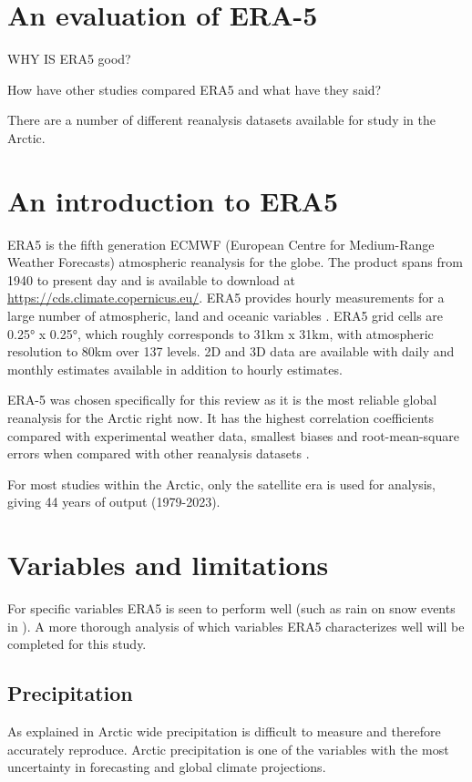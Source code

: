 \documentclass[11pt, oneside]{article}
\begin{document}
\section{An evaluation of ERA-5}
WHY IS ERA5 good?

How have other studies compared ERA5 and what have they said?

There are a number of different reanalysis datasets available for study in the Arctic. 


\section{An introduction to ERA5}
ERA5 is the fifth generation ECMWF (European Centre for Medium-Range Weather Forecasts) atmospheric reanalysis for the globe. The product spans from 1940 to present day and is available to download at \url{https://cds.climate.copernicus.eu/}. ERA5 provides hourly measurements for a large number of atmospheric, land and oceanic variables \cite{hersbach2020era5}. 
ERA5 grid cells are 0.25° x 0.25°, which roughly corresponds to 31km x 31km, with atmospheric resolution to 80km over 137 levels. 2D and 3D data are available with daily and monthly estimates available in addition to hourly estimates. 

ERA-5 was chosen specifically for this review as it is the most reliable global reanalysis for the Arctic right now. It has the highest correlation coefficients compared with experimental weather data, smallest biases and root-mean-square errors when compared with other reanalysis datasets \cite{graham2019improved, hillebrand2021comparison}. 

For most studies within the Arctic, only the satellite era is used for analysis, giving 44 years of output (1979-2023).


\section{Variables and limitations}\label{Hydrological variables and limitations }
For specific variables ERA5 is seen to perform well (such as rain on snow events in \cite{dou2021trends}). A more thorough analysis of which variables ERA5 characterizes well will be completed for this study.


\subsection{Precipitation}\label{precipitation}
As explained in \cite{boisvert2018intercomparison} Arctic wide precipitation is difficult to measure and therefore accurately reproduce. Arctic precipitation is one of the variables with the most uncertainty in forecasting and global climate projections. 
\end{document}
